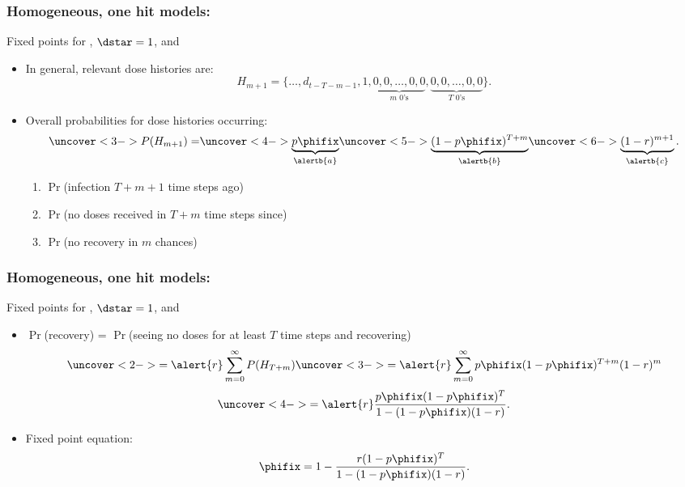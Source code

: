 \begin{frame}
  \frametitle{Homogeneous, one hit models:}

  \begin{block}{Fixed points for , $\dstar=1$, and }
    \begin{itemize}
    \item<1->
      In general, relevant dose histories are:
      $$
      H_{m+1} = \{ \ldots, d_{t-T-m-1}, 1, \underbrace{0, 0, \ldots, 0, 0}_{\mbox{$m$ 0's}}, \underbrace{0, 0, \ldots, 0, 0}_{\mbox{$T$ 0's}} \}.
      $$
    \item<2->
      Overall probabilities for dose histories occurring:
      $$
      \uncover<3->{
        P(H_{m+1}) = 
        }
      \uncover<4->{
       \underbrace{p\phifix}_{\alertb{a}}
      }
      \uncover<5->{
        \underbrace{(1 -p\phifix)^{T+m}}_{\alertb{b}}
      }
      \uncover<6->{
        \underbrace{(1-r)^{m+1}}_{\alertb{c}}.
      }
      $$
      \begin{enumerate}
      \item<4->[a:] $\Pr$(infection $T+m+1$ time steps ago)
      \item<5->[b:] $\Pr$(no doses received in $T+m$ time steps since)
      \item<6->[c:] $\Pr$(no recovery in $m$ chances)
      \end{enumerate}
    \end{itemize}
  \end{block}


\end{frame}


\begin{frame}
  \frametitle{Homogeneous, one hit models:}

  \begin{block}{Fixed points for , $\dstar=1$, and }
    \begin{itemize}
    \item<1->
      $\Pr$(recovery) = $\Pr$(seeing no doses for at least $T$ time steps
      and recovering) 
      $$
      \uncover<2->{
        = \alert{r} \sum_{m=0}^{\infty} P(H_{T+m})
      }
      \uncover<3->{
        = \alert{r} \sum_{m=0}^{\infty} 
        p\phifix
        (1 -p\phifix)^{T+m}
        (1-r)^{m}
      }
      $$
      $$
      \uncover<4->{
        = \alert{r} 
        \frac{p\phifix (1-p\phifix)^T}
        {1 - (1-p\phifix)(1-r)}.
      }
      $$
    \item<5->
      Fixed point equation:
      $$
      \phifix =
      1 - \frac{r (1-p\phifix)^T }
      {1 - (1-p\phifix)(1-r)}.
      $$
    \end{itemize}
  \end{block}
\end{frame}

